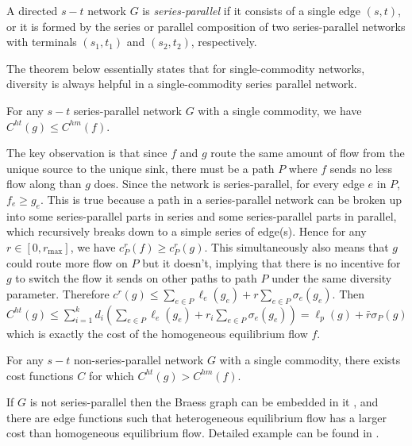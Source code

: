 \begin{definition}
A directed $s-t$ network $G$ is {\it series-parallel} if it consists of a single edge $(s, t)$, or it is formed by the series or parallel composition of two series-parallel networks with terminals $(s_1, t_1)$ and $(s_2, t_2)$, respectively.
\end{definition}

The theorem below essentially states that for single-commodity networks, diversity is always helpful in a single-commodity series parallel network.

\begin{theorem}
For any $s-t$ series-parallel network $G$ with a single commodity, we have $C^{ht}(g)\le C^{hm}(f)$.
\label{diverse1}
\end{theorem}

\begin{proof-sketch}

The key observation is that since $f$ and $g$ route the same amount of flow from the unique source to the unique sink, there must be a path $P$ where $f$ sends no less flow along than $g$ does. Since the network is series-parallel, for every edge $e$ in $P$, $f_e \ge g_e$. This is true because a path in a series-parallel network can be broken up into some series-parallel parts in series and some series-parallel parts in parallel, which recursively breaks down to a simple series of edge(s). Hence for any $r\in [0, r_{\max}]$, we have $c_P^r(f)\ge c_P^r(g)$. This simultaneously also means that $g$ could route more flow on $P$ but it doesn't, implying that there is no incentive for $g$ to switch the flow it sends on other paths to path $P$ under the same diversity parameter. Therefore $c^r(g)\le \sum_{e\in P} \ell_e(g_e)+r\sum_{e\in P}\sigma_e(g_e)$. Then $C^{ht}(g)\le \sum_{i=1}^k d_i(\sum_{e\in P} \ell_e(g_e)+r_i\sum_{e\in P}\sigma_e(g_e))=\ell_p(g)+\bar{r}\sigma_P(g)$ which is exactly the cost of the homogeneous equilibrium flow $f$.
\end{proof-sketch}


\begin{theorem}
For any $s-t$ non-series-parallel network $G$ with a single commodity, there exists cost functions $C$ for which $C^{ht}(g)> C^{hm}(f)$.
\label{diversethm2}
\end{theorem}

\begin{proof-sketch}
If $G$ is not series-parallel then the Braess graph can be embedded in it \cite{Valdes:1979:RSP:800135.804393}, and there are edge functions such that heterogeneous equilibrium flow has a larger cost than homogeneous equilibrium flow. Detailed example can be found in \cite{ijcai2018-24}.
\end{proof-sketch}

